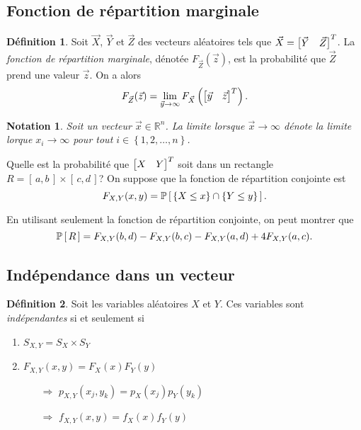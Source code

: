 \documentclass[11pt]{article}
\makeatletter
\renewcommand\P[1]{%
	\ensuremath{%
		\mathbb{P}\left[\,#1\,\right]%
	}%
}%
\newcommand\invec[1]{%
	\ensuremath{%
		\left[%
			\begin{matrix}%
				#1%
			\end{matrix}%
		\right]^T%
	}%
}%
\newtheorem*{notation}{Notation}
\theoremstyle{remark}
\theoremstyle{definition}
\newtheorem*{@definition}{Définition}
\newenvironment{definition}{%
	\begin{@definition}%
}{%
	\end{@definition}%
	\setcounter{property}{0}%
}
\makeatother
\begin{document}
\subsection{Fonction de répartition marginale}
\begin{definition}
	Soit $\vec{X}$, $\vec{Y}$ et $\vec{Z}$ des vecteurs aléatoires tels que
	$\vec{X}=\invec{\vec{Y}&\vec{Z}}$. La \textit{fonction de répartition
	marginale}, dénotée $F_{\vec{Z}}(\vec{z})$, est la probabilité que
	$\vec{Z}$ prend une valeur $\vec{z}$. On a alors
	\begin{equation*}
		F_{\vec{Z}}(\vec{z})=\lim_{\vec{y}\rightarrow\infty}F_{\vec{X}}\left(
		\invec{\vec{y}&\vec{z}}\right).
	\end{equation*}
\end{definition}

\begin{notation}
	Soit un vecteur $\vec{x}\in\mathbb{R}^n$. La limite lorsque
	$\vec{x}\rightarrow\infty$ dénote la limite lorque $x_i\rightarrow\infty$
	pour tout $i\in\left\{1,2,\dots,n\right\}$.
\end{notation}

\begin{exemple}
	Quelle est la probabilité que $\invec{X&Y}$ soit dans un rectangle $R=[\,a,
	b\,]\times[\,c,d\,]$? On suppose que la fonction de répartition conjointe
	est
	\begin{equation*}
		F_{X,Y}(x,y)=\P{\left\{X\leq x\right\}\cap\left\{Y\leq y\right\}}.
	\end{equation*}

	En utilisant seulement la fonction de répartition conjointe, on peut
	montrer que
	\begin{equation*}
		\P{R}
		=F_{X,Y}(b,d)-F_{X,Y}(b,c)-F_{X,Y}(a,d)+4F_{X,Y}(a,c).
	\end{equation*}
\end{exemple}

\subsection{Indépendance dans un vecteur}
\begin{definition}
	Soit les variables aléatoires $X$ et $Y$. Ces variables sont
	\textit{indépendantes} si et seulement si
	\begin{enumerate}
		\item $S_{X,Y}=S_X\times S_Y$
		\item $F_{X,Y}(x,y)=F_X(x)F_Y(y)$
		\begin{itemize}
			\item[$\Rightarrow$] $p_{X,Y}(x_j,y_k)=p_X(x_j)p_Y(y_k)$
			\item[$\Rightarrow$] $f_{X,Y}(x,y)=f_X(x)f_Y(y)$
		\end{itemize}
	\end{enumerate}
\end{definition}
\end{document}
